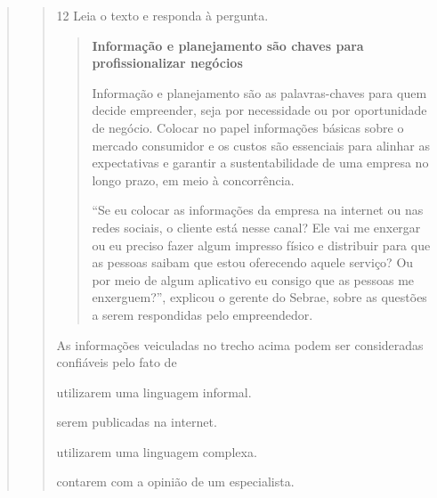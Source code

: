 \begin{escolha}
\begin{escolha}
\begin{escolha}
\begin{quote}
\begin{quote}
{\num{12} Leia o texto e responda à pergunta.

\begin{quote}
\textbf{Informação e planejamento são chaves para profissionalizar negócios}

Informação e planejamento são as palavras-chaves para quem decide
empreender, seja por necessidade ou por oportunidade de negócio. Colocar
no papel informações básicas sobre o mercado consumidor e os custos são
essenciais para alinhar as expectativas e garantir a sustentabilidade de
uma empresa no longo prazo, em meio à concorrência.

``Se eu colocar as informações da empresa na internet ou nas redes
sociais, o cliente está nesse canal? Ele vai me enxergar ou eu preciso
fazer algum impresso físico e distribuir para que as pessoas saibam que
estou oferecendo aquele serviço? Ou por meio de algum aplicativo eu
consigo que as pessoas me enxerguem?'', explicou o gerente do Sebrae,
sobre as questões a serem respondidas pelo empreendedor.
\end{quote}


As informações veiculadas no trecho acima podem ser consideradas
confiáveis pelo fato de

\begin{escolha}
  \item utilizarem uma linguagem informal.

  \item serem publicadas na internet.

  \item utilizarem uma linguagem complexa.

  \item contarem com a opinião de um especialista.
\end{escolha}

}
\end{quote}
\end{quote}
\end{escolha}
\end{escolha}
\end{escolha}
